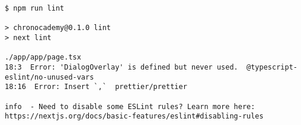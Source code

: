 \begin{verbatim}
$ npm run lint

> chronocademy@0.1.0 lint
> next lint

./app/app/page.tsx
18:3  Error: 'DialogOverlay' is defined but never used.  @typescript-eslint/no-unused-vars
18:16  Error: Insert `,`  prettier/prettier

info  - Need to disable some ESLint rules? Learn more here: https://nextjs.org/docs/basic-features/eslint#disabling-rules
\end{verbatim}
